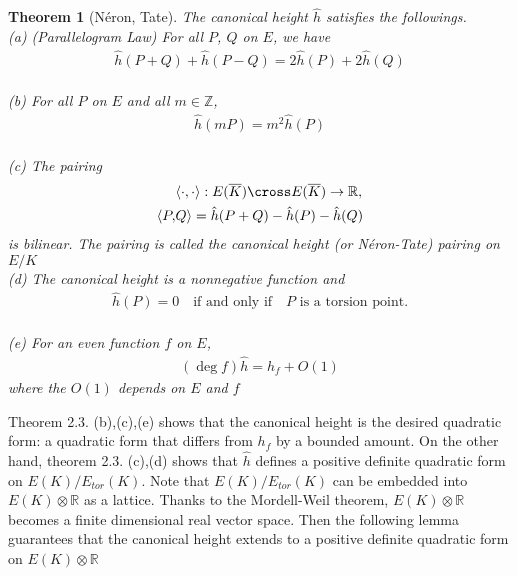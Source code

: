 \documentclass[11pt]{article}
\newcommand{\<}{\langle}
\renewcommand{\>}{\rangle}
\numberwithin{equation}{section}
\theoremstyle{plain}
\newtheorem{thm}{Theorem}[section]
\theoremstyle{definition}
\begin{document}
    \begin{thm}[N\'eron, Tate] The canonical height \(\hat{h}\) satisfies the followings. \\
    (a) (Parallelogram Law) For all \(P\), \(Q\) on \(E\), we have
        \begin{align*}
            \hat{h}(P+Q) + \hat{h}(P-Q) = 2\hat{h}(P) + 2\hat{h}(Q)
        \end{align*}
    \\
    (b) For all \(P\) on \(E\) and all \(m \in \mathbb{Z}\),
        \begin{align*}
            \hat{h}(mP) = m^2 \hat{h}(P)
        \end{align*}
    \\
    (c) The pairing
        \begin{align*}
            & \langle \cdot, \cdot \rangle : E(\overline{K}) \cross E(\overline{K}) \rightarrow \mathbb{R}, \\
             \langle P,& Q \rangle= \hat{h}(P+Q) - \hat{h}(P) - \hat{h}(Q)
        \end{align*}
        is bilinear. The pairing is called the canonical height (or N\'eron-Tate) pairing on \(E/K\)
    \\
    (d) The canonical height is a nonnegative function and
        \begin{align*}
             \hat{h}(P) = 0 \quad \text{if and only if} \quad P \text{ is a torsion point.}
        \end{align*} 
    \\
    (e) For an even function \(f\) on \(E\),
        \begin{align*}
            (\deg f) \hat{h} = h_f + O(1)
        \end{align*}
        \quad where the \(O(1)\) depends on \(E\) and \(f\)
    \end{thm}
    
    Theorem 2.3. (b),(c),(e) shows that the canonical height is the desired quadratic form: a quadratic form that differs from \(h_f\) by a bounded amount. On the other hand, theorem 2.3. (c),(d) shows that \(\hat{h}\) defines a positive definite quadratic form on \(E(K)/E_{tor}(K)\). Note that \(E(K)/E_{tor}(K)\) can be embedded into \(E(K) \otimes \mathbb{R}\) as a lattice. Thanks to the Mordell-Weil theorem, \(E(K) \otimes \mathbb{R}\) becomes a finite dimensional real vector space. Then the following lemma guarantees that the canonical height extends to a positive definite quadratic form on \(E(K) \otimes \mathbb{R}\)
    
\end{document}
